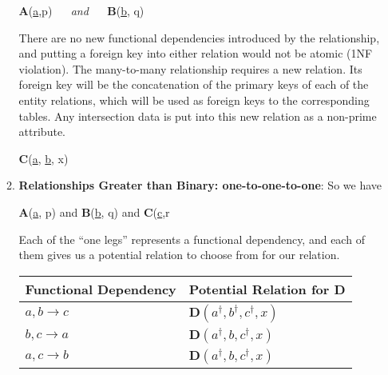 \documentclass{report}
\begin{document}
\begin{itemize}
\begin{enumerate}
                    \begin{center}
                        \textbf{A}(\underline{a},p) $\quad$ \textit{and} $\quad$ \textbf{B}(\underline{b}, q)
                    \end{center}
                    \bigbreak \noindent 
                    There are no new functional dependencies introduced by the relationship, and putting a foreign key into either relation would not be atomic (1NF violation). The many-to-many relationship requires a new relation. Its foreign key will be the concatenation of the primary keys of each of the entity relations, which will be used as foreign keys to the corresponding tables. Any intersection data is put into this new relation as a non-prime attribute.
                    \bigbreak \noindent 
                    \begin{center}
                        \textbf{C}(\underline{a}\dag, \underline{b}\dag, x)
                    \end{center}
                \item \textbf{Relationships Greater than Binary: one-to-one-to-one}:
                    \bigbreak \noindent 
                    \bigbreak \noindent 
                    So we have 
                    \begin{center}
                        \textbf{A}(\underline{a}, p) and \textbf{B}(\underline{b}, q) and \textbf{C}(\underline{c},r
                    \end{center}
                    \bigbreak \noindent 
                    Each of the “one legs” represents a functional dependency, and each of them gives us a potential relation to choose from for our relation.
                    \bigbreak \noindent 
                    \begin{table}[h!]
                        \centering
                        \begin{tabular}{ll}
                            \toprule
                            \textbf{Functional Dependency} & \textbf{Potential Relation for \textbf{D}} \\ 
                            \midrule
                            $a, b \rightarrow c$ & $\mathbf{D} \left( a^\dagger, b^\dagger, c^\dagger, x \right)$ \\[8pt]
                            $b, c \rightarrow a$ & $\mathbf{D} \left( a^\dagger, b, c^\dagger, x \right)$ \\[8pt]
                            $a, c \rightarrow b$ & $\mathbf{D} \left( a^\dagger, b, c^\dagger, x \right)$ \\ 

\end{tabular}
\end{table}
\end{enumerate}
\end{itemize}
\end{document}
